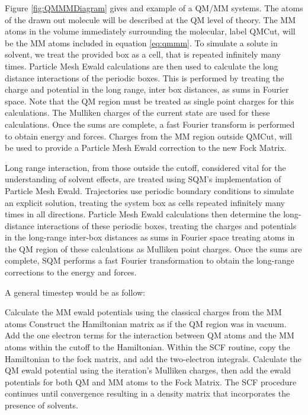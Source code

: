     Figure \ref{fig:QMMMDiagram} gives and example of a QM/MM systems.
    The atoms of the drawn out molecule will be described at the QM level of theory.
    The MM atoms in the volume immediately surrounding the molecular, label QMCut, will be the MM atoms included in equation \ref{eq:qmmm}.
    To simulate a solute in solvent, we treat the provided box as a cell, that is repeated infinitely many times.
    Particle Mesh Ewald calculations are then used to calculate the long distance interactions of the periodic boxes.
    This is performed by treating the charge and potential in the long range, inter box distances, as sums in Fourier space.\cite{Darden1993}
    Note that the QM region must be treated as single point charges for this calculations.
    The Mulliken charges of the current state are used for these calculations.
    Once the sums are complete, a fast Fourier transform is performed to obtain energy and forces.
    Charges from the MM region outside QMCut, will be used to provide a Particle Mesh Ewald correction to the new Fock Matrix.\cite{Walker2008}

    Long range interaction, from those outside the cutoff, considered vital for the understanding of solvent effects, are treated using SQM’s implementation of Particle Mesh Ewald.
    Trajectories use periodic boundary conditions to simulate an explicit solution, treating the system box as cells repeated infinitely many times in all directions.
    Particle Mesh Ewald calculations then determine the long-distance interactions of these periodic boxes, treating the charges and potentials in the long-range inter-box distances as sums in Fourier space treating atoms in the QM region of these calculations as Mulliken point charges.
    Once the sums are complete, SQM performs a fast Fourier transformation to obtain the long-range corrections to the energy and forces.  

    A general timestep would be as follow: 

    Calculate the MM ewald potentials using the classical charges from the MM atoms Construct the Hamiltonian matrix as if the QM region was in vacuum.
    Add the one electron terms for the interaction between QM atoms and the MM atoms within the cutoff to the Hamiltonian.
    Within the SCF routine, copy the Hamiltonian to the fock matrix, and add the two-electron integrals.
    Calculate the QM ewald potential using the iteration’s Mulliken charges, then add the ewald potentials for both QM and MM atoms to the Fock Matrix.
    The SCF procedure continues until convergence resulting in a density matrix that incorporates the presence of solvents.

